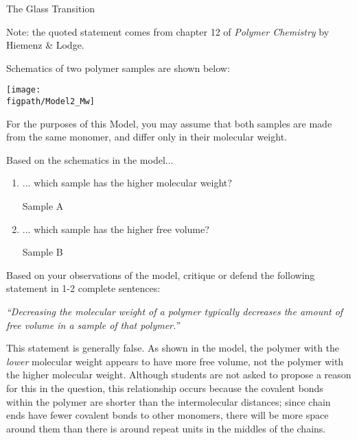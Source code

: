 \begin{activity}{The Glass Transition}
\begin{ctqs}
\begin{solution}[1.75in]{}
					Note: the quoted statement comes from chapter 12 of \emph{Polymer Chemistry} by Hiemenz \& Lodge.
				
				\end{solution}
	
\end{ctqs}

\begin{model}
\label{\labelbase:mdl:chainends}
	
	Schematics of two polymer samples are shown below:
	
	\vspace{6pt}
	\centerline{\texttt{[image: \\figpath/Model2\_Mw]}}
	
	For the purposes of this Model, you may assume that both samples are made from the same monomer, and differ only in their molecular weight.
	
\end{model}

\begin{ctqs}

	\question Based on the schematics in the model...
		\begin{enumerate}
			\item ... which sample has the higher molecular weight?
				
				\begin{solution}[0.25in]{}
					Sample A
				\end{solution}
				
			\item ... which sample has the higher free volume?
				
				\begin{solution}[0.25in]{}
					Sample B
				\end{solution}
				
		\end{enumerate}
		
	\question Based on your observations of the model, critique or defend the following statement in 1-2 complete sentences:
	
		\emph{``Decreasing the molecular weight of a polymer typically decreases the amount of free volume in a sample of that polymer.''}
		
		\begin{solution}[1.75in]{}
			This statement is generally false.  As shown in the model, the polymer with the \emph{lower} molecular weight appears to have more free volume, not the polymer with the higher molecular weight.  Although students are not asked to propose a reason for this in the question, this relationship occurs because the covalent bonds within the polymer are shorter than the intermolecular distances; since chain ends have fewer covalent bonds to other monomers, there will be more space around them than there is around repeat units in the middles of the chains.
		\end{solution}
	

\end{ctqs}
\end{activity}

